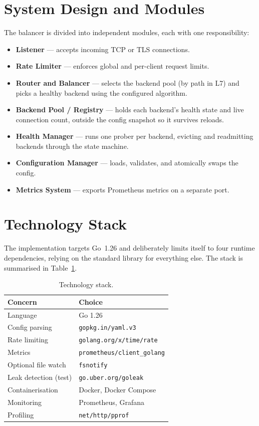 \documentclass[11pt,a4paper]{report}
\newcommand{\code}[1]{\texttt{#1}}
\begin{document}
\section{System Design and Modules}
The balancer is divided into independent modules, each with one responsibility:
\begin{itemize}
  \item \textbf{Listener} --- accepts incoming TCP or TLS connections.
  \item \textbf{Rate Limiter} --- enforces global and per-client request limits.
  \item \textbf{Router and Balancer} --- selects the backend pool (by path in L7) and picks a
  healthy backend using the configured algorithm.
  \item \textbf{Backend Pool / Registry} --- holds each backend's health state and live
  connection count, outside the config snapshot so it survives reloads.
  \item \textbf{Health Manager} --- runs one prober per backend, evicting and readmitting
  backends through the state machine.
  \item \textbf{Configuration Manager} --- loads, validates, and atomically swaps the config.
  \item \textbf{Metrics System} --- exports Prometheus metrics on a separate port.
\end{itemize}

\section{Technology Stack}
The implementation targets Go~1.26 and deliberately limits itself to four runtime
dependencies, relying on the standard library for everything else. The stack is summarised in
Table~\ref{tab:stack}.

\begin{table}[htbp]
\centering
\caption{Technology stack.}
\label{tab:stack}
\begin{tabular}{ll}
\toprule
\textbf{Concern} & \textbf{Choice}\\
\midrule
Language & Go 1.26\\
Config parsing & \code{gopkg.in/yaml.v3}\\
Rate limiting & \code{golang.org/x/time/rate}\\
Metrics & \code{prometheus/client\_golang}\\
Optional file watch & \code{fsnotify}\\
Leak detection (test) & \code{go.uber.org/goleak}\\
Containerisation & Docker, Docker Compose\\
Monitoring & Prometheus, Grafana\\
Profiling & \code{net/http/pprof}\\
\bottomrule
\end{tabular}
\end{table}
\end{document}
